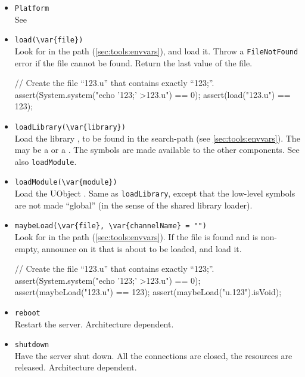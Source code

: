 \begin{itemize}
\item \lstinline'Platform'\\
  See 

\item \lstinline|load(\var{file})|\\
  Look for  in the \urbi path (\autoref{sec:tools:envvars}),
  and load it.  Throw a \lstinline|FileNotFound| error if the file
  cannot be found.  Return the last value of the file.
\begin{urbiscript}[firstnumber=last]
// Create the file ``123.u'' that contains exactly ``123;''.
assert(System.system("echo '123;' >123.u") == 0);
assert(load("123.u") == 123);
\end{urbiscript}

\item \lstinline'loadLibrary(\var{library})'\\
  Load the library , to be found in the
   search-path (see
  \autoref{sec:tools:envvars}).  The  may be a
   or a .  The \Cxx symbols are made
  available to the other \Cxx components.  See also
  \lstinline|loadModule|.

\item \lstinline'loadModule(\var{module})'\\
  Load the UObject .  Same as \lstinline|loadLibrary|,
  except that the low-level \Cxx symbols are not made ``global'' (in
  the sense of the shared library loader).

\item \lstinline|maybeLoad(\var{file}, \var{channelName} = "")|\\
  Look for  in the \urbi path
  (\autoref{sec:tools:envvars}).  If the file is found and
   is non-empty, announce on it that  is
  about to be loaded, and load it.

\begin{urbiscript}[firstnumber=last]
// Create the file ``123.u'' that contains exactly ``123;''.
assert(System.system("echo '123;' >123.u") == 0);
assert(maybeLoad("123.u") == 123);
assert(maybeLoad("u.123").isVoid);
\end{urbiscript}

\item \lstinline'reboot'\\
  Restart the \urbi server.  Architecture dependent.

\item \lstinline'shutdown'\\
  Have the \urbi server shut down.  All the connections are closed,
  the resources are released.  Architecture dependent.
\end{itemize}


